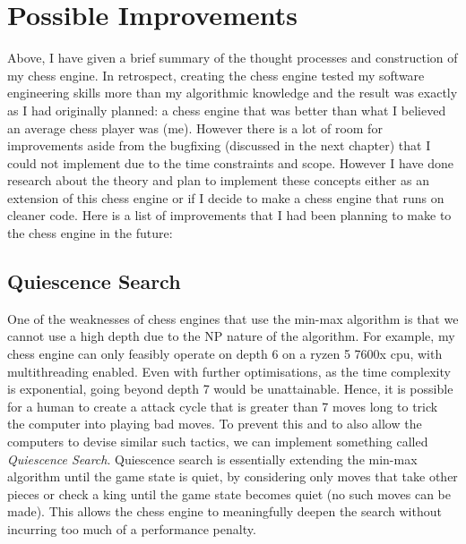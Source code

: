 \chapter{Possible Improvements}
Above, I have given a brief summary of the thought processes and construction of my chess engine. In retrospect, creating the chess engine tested my software engineering skills more than my algorithmic knowledge and the result was exactly as I had originally planned: a chess engine that was better than what I believed an average chess player was (me). However there is a lot of room for improvements aside from the bugfixing (discussed in the next chapter) that I could not implement due to the time constraints and scope. However I have done research about the theory and plan to implement these concepts either as an extension of this chess engine or if I decide to make a chess engine that runs on cleaner code. Here is a list of improvements that I had been planning to make to the chess engine in the future: 
\section{Quiescence Search}
One of the weaknesses of chess engines that use the min-max algorithm is that we cannot use a high depth due to the NP nature of the algorithm. For example, my chess engine can only feasibly operate on depth 6 on a ryzen 5 7600x cpu, with multithreading enabled. Even with further optimisations, as the time complexity is exponential, going beyond depth 7 would be unattainable. Hence, it is possible for a human to create a attack cycle that is greater than 7 moves long to trick the computer into playing bad moves. To prevent this and to also allow the computers to devise similar such tactics, we can implement something called \textit{Quiescence Search}. Quiescence search is essentially extending the min-max algorithm until the game state is quiet, by considering only moves that take other pieces or check a king until the game state becomes quiet (no such moves can be made). This allows the chess engine to meaningfully deepen the search without incurring too much of a performance penalty.
